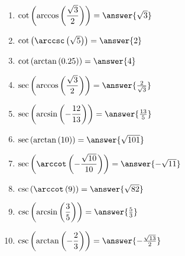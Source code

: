 \documentclass{ximera}
\begin{document}
\begin{exercise}
\begin{multicols}{2}
\begin{enumerate}
\item  $\cot\left(\arccos\left(\dfrac{\sqrt{3}}{2}\right)\right)=\answer{\sqrt{3}}$
\item  $\cot\left(\arccsc\left(\sqrt{5}\right)\right)=\answer{2}$ 
\item  $\cot\left(\arctan \left( 0.25 \right)\right)=\answer{4}$ 
\item  $\sec\left(\arccos\left(\dfrac{\sqrt{3}}{2}\right)\right)=\answer{\frac{2}{\sqrt{3}}}$
\item  $\sec\left(\arcsin\left(-\dfrac{12}{13}\right)\right)=\answer{\frac{13}{5}}$ 
\item  $\sec\left(\arctan\left(10\right)\right)=\answer{\sqrt{101}}$ 
\item  $\sec\left(\arccot\left(-\dfrac{\sqrt{10}}{10}\right)\right)=\answer{-\sqrt{11}}$
\item  $\csc\left(\arccot\left(9 \right)\right)=\answer{\sqrt{82}}$ 
\item  $\csc\left(\arcsin\left(\dfrac{3}{5}\right)\right)=\answer{\frac{5}{3}}$
\item  $\csc\left(\arctan\left(-\dfrac{2}{3}\right)\right)=\answer{-\frac{\sqrt{13}}{2}}$ \label{stillmoreexactlast}
\end{enumerate}
\end{multicols}


\end{exercise}
\end{document}

